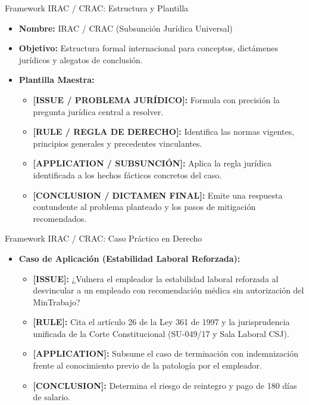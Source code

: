 \documentclass[aspectratio=169]{beamer}
\begin{document}
\begin{frame}{Framework IRAC / CRAC: Estructura y Plantilla}


\begin{itemize}
  \item \textbf{Nombre:} IRAC / CRAC (Subsunción Jurídica Universal)
  \item \textbf{Objetivo:} Estructura formal internacional para conceptos, dictámenes jurídicos y alegatos de conclusión.
  \item \textbf{Plantilla Maestra:}
  \begin{itemize}
    \item \textbf{[ISSUE / PROBLEMA JURÍDICO]:} Formula con precisión la pregunta jurídica central a resolver.
    \item \textbf{[RULE / REGLA DE DERECHO]:} Identifica las normas vigentes, principios generales y precedentes vinculantes.
    \item \textbf{[APPLICATION / SUBSUNCIÓN]:} Aplica la regla jurídica identificada a los hechos fácticos concretos del caso.
    \item \textbf{[CONCLUSION / DICTAMEN FINAL]:} Emite una respuesta contundente al problema planteado y los pasos de mitigación recomendados.
  \end{itemize}
\end{itemize}
\end{frame}

\begin{frame}{Framework IRAC / CRAC: Caso Práctico en Derecho}


\begin{itemize}
  \item \textbf{Caso de Aplicación (Estabilidad Laboral Reforzada):}
  \begin{itemize}
    \item \textbf{[ISSUE]:} ¿Vulnera el empleador la estabilidad laboral reforzada al desvincular a un empleado con recomendación médica sin autorización del MinTrabajo?
    \item \textbf{[RULE]:} Cita el artículo 26 de la Ley 361 de 1997 y la jurisprudencia unificada de la Corte Constitucional (SU-049/17 y Sala Laboral CSJ).
    \item \textbf{[APPLICATION]:} Subsume el caso de terminación con indemnización frente al conocimiento previo de la patología por el empleador.
    \item \textbf{[CONCLUSION]:} Determina el riesgo de reintegro y pago de 180 días de salario.
  \end{itemize}
\end{itemize}
\end{frame}
\end{document}
